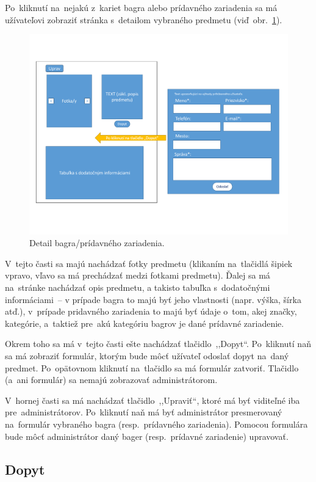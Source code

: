 Po~kliknutí na~nejakú z~kariet bagra alebo prídavného zariadenia sa má užívateľovi zobraziť stránka s~detailom vybraného predmetu (viď~obr.~\ref{detail}).

\begin{figure}[H]\centering
\includegraphics[width=140mm]{../img/UI concept/detail}
\caption{Detail bagra/prídavného zariadenia.}
\label{detail}
\end{figure}

V~tejto časti sa majú nachádzať fotky predmetu (klikaním na~tlačidlá šipiek vpravo, vľavo sa má prechádzať medzi fotkami predmetu). Ďalej sa má na~stránke nachádzať opis predmetu, a takisto tabuľka s~dodatočnými informáciami~-- v prípade bagra to majú byť jeho vlastnosti (napr. výška, šírka atď.), v~prípade pridavného zariadenia to majú byť údaje o~tom, akej značky, kategórie, a~taktiež pre~akú kategóriu bagrov je dané prídavné zariadenie.

Okrem toho sa má v~tejto časti ešte nachádzať tlačidlo~,,Dopyt``. Po~kliknutí naň sa má zobraziť formulár, ktorým bude môcť užívateľ odoslať dopyt na~daný predmet. Po~opätovnom kliknutí na~tlačidlo sa má formulár zatvoriť. Tlačidlo (a~ani formulár) sa nemajú zobrazovať administrátorom.

V~hornej časti sa má nachádzať tlačidlo~,,Upraviť``, ktoré má byť viditeľné iba pre~administrátorov. Po~kliknutí naň má byť administrátor presmerovaný na~formulár vybraného bagra (resp.~prídavného zariadenia). Pomocou formulára bude môcť administrátor daný bager (resp.~prídavné zariadenie) upravovať.

\subsection{Dopyt}
\label{dopyt}

